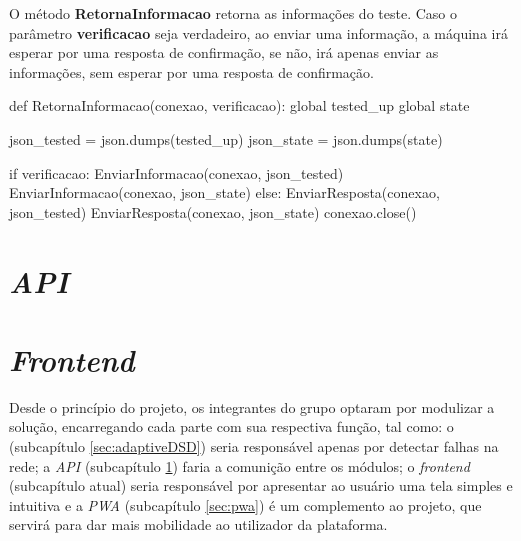 O método \textbf{RetornaInformacao} retorna as informações do teste. Caso o parâmetro \textbf{verificacao} seja verdadeiro, ao enviar uma informação, a máquina irá esperar por uma resposta 
de confirmação, se não, irá apenas enviar as informações, sem esperar por uma resposta de confirmação.

\vspace*{1cm}
\begin{python}
def RetornaInformacao(conexao, verificacao):
    global tested_up
    global state

    json_tested = json.dumps(tested_up)
    json_state = json.dumps(state)

    if verificacao:
        EnviarInformacao(conexao, json_tested)
        EnviarInformacao(conexao, json_state)
    else:
        EnviarResposta(conexao, json_tested)
        EnviarResposta(conexao, json_state)
    conexao.close()
\end{python}










\section{\textit{API}}
\label{sec:api}









\section{\textit{Frontend}}
\label{sec:frontend}

Desde o princípio do projeto, os integrantes do grupo optaram por modulizar a solução, encarregando cada parte com sua respectiva função, tal como: o \adaptive{} (subcapítulo \ref{sec:adaptiveDSD}) seria responsável apenas por detectar falhas na rede; a \textit{API} (subcapítulo \ref{sec:api}) faria a comunição entre os módulos; o \textit{frontend} (subcapítulo atual) seria responsável por apresentar ao usuário uma tela simples e intuitiva e a \textit{PWA} (subcapítulo \ref{sec:pwa}) é um complemento ao projeto, que servirá para dar mais mobilidade ao utilizador da plataforma.

